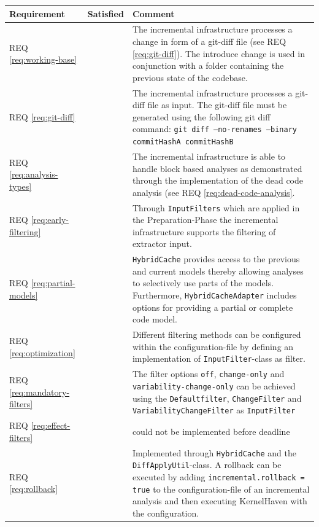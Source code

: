 \documentclass[a4paper]{article}
\newcommand{\cmark}{\ding{51}}%
\newcommand{\xmark}{\ding{55}}%
\begin{document}
\begin{longtable}{ |  L{0.17\textwidth} | C{0.12\textwidth} | L{0.63\textwidth} |}
	\hline
	\textbf{Requirement} & \textbf{Satisfied} & \textbf{Comment} \\
	\hline
	REQ \ref{req:working-base} & \cmark & The incremental infrastructure processes a change in form of a git-diff file (see REQ \ref{req:git-diff}). The introduce change is used in conjunction with a folder containing the previous state of the codebase. \\ \hline
	REQ \ref{req:git-diff} & \cmark & The incremental infrastructure processes a git-diff file as input. The git-diff file must be generated using the following git diff command: \texttt{git diff --no-renames --binary commitHashA commitHashB} \\ \hline
	REQ \ref{req:analysis-types} & \cmark & The incremental infrastructure is able to handle block based analyses as demonstrated through the implementation of the dead code analysis (see REQ \ref{req:dead-code-analysis}. \\ \hline
	REQ \ref{req:early-filtering} & \cmark & Through \texttt{InputFilters} which are applied in the Preparation-Phase the incremental infrastructure supports the filtering of extractor input. \\ \hline
	REQ \ref{req:partial-models} & \cmark & \texttt{Hybrid\-Cache} provides access to the previous and current models thereby allowing analyses to selectively use parts of the models. Furthermore, \texttt{Hybrid\-Cache\-Adapter} includes options for providing a partial or complete code model. \\ \hline
	REQ \ref{req:optimization} & \cmark &  Different filtering methods can be configured within the configuration-file by defining an implementation of \texttt{InputFilter}-class as filter. \\ \hline
	REQ \ref{req:mandatory-filters} & \cmark &  The filter options \texttt{off}, \texttt{change-only} and \texttt{variability-change-only} can be achieved using the \texttt{Defaultfilter}, \texttt{ChangeFilter} and \texttt{VariabilityChangeFilter} as  \texttt{InputFilter} \\ \hline
	REQ \ref{req:effect-filters} & \xmark &  could not be implemented before deadline\\ \hline
	REQ \ref{req:rollback} & \cmark & Implemented through \texttt{Hybrid\-Cache} and the \texttt{DiffApplyUtil}-class. A rollback can be executed by adding \texttt{incremental.rollback = true} to the configuration-file of an incremental analysis and then executing KernelHaven with the configuration. \\ \hline

\end{longtable}
\end{document}
